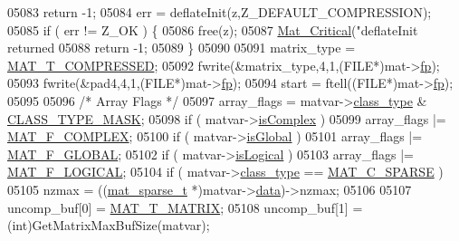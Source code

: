 \begin{DoxyCode}
{{{{{{{{{{{{{{{{{{{{{{{{{{{{{{05083             \textcolor{keywordflow}{return} -1;
05084         err = deflateInit(z,Z\_DEFAULT\_COMPRESSION);
05085         \textcolor{keywordflow}{if} ( err != Z\_OK ) \{
05086             free(z);
05087             \hyperlink{group__mat__util_gaf51f2bfbb5580f575e4dd79757e2b80c}{Mat\_Critical}(\textcolor{stringliteral}{"deflateInit returned %
05088             \textcolor{keywordflow}{return} -1;
05089         \}
05090 
05091         matrix\_type = \hyperlink{group___m_a_t_ggacf7b3b879282b7ab3a51190e49bf3453a30437f2eb3becc2fa6e5d96599d7f724}{MAT\_T\_COMPRESSED};
05092         fwrite(&matrix\_type,4,1,(FILE*)mat->\hyperlink{struct__mat__t_a85f562e407ca9ad4d2a6e14f839432b7}{fp});
05093         fwrite(&pad4,4,1,(FILE*)mat->\hyperlink{struct__mat__t_a85f562e407ca9ad4d2a6e14f839432b7}{fp});
05094         start = ftell((FILE*)mat->\hyperlink{struct__mat__t_a85f562e407ca9ad4d2a6e14f839432b7}{fp});
05095 
05096         \textcolor{comment}{/* Array Flags */}
05097         array\_flags = matvar->\hyperlink{group___m_a_t_aff13035bf3265dd7d9425e5d40c839d4}{class\_type} & \hyperlink{mat5_8c_a24b94e17e9c34b9c795798099c710751}{CLASS\_TYPE\_MASK};
05098         \textcolor{keywordflow}{if} ( matvar->\hyperlink{group___m_a_t_aeb03b3a69f108dc05470b00443a43739}{isComplex} )
05099             array\_flags |= \hyperlink{group___m_a_t_ggab9d6ef9e3ddca78a317b173f01d53fbbacd7b091a11184aad7fc6078c04470780}{MAT\_F\_COMPLEX};
05100         \textcolor{keywordflow}{if} ( matvar->\hyperlink{group___m_a_t_af26c71c4c0ddb14931d15910dddac1bc}{isGlobal} )
05101             array\_flags |= \hyperlink{group___m_a_t_ggab9d6ef9e3ddca78a317b173f01d53fbba49084e0c796aa7963e53f7539525d40d}{MAT\_F\_GLOBAL};
05102         \textcolor{keywordflow}{if} ( matvar->\hyperlink{group___m_a_t_a866c1539e68073a837833d74cd4a65be}{isLogical} )
05103             array\_flags |= \hyperlink{group___m_a_t_ggab9d6ef9e3ddca78a317b173f01d53fbba57eb5c6e200bcbc0f1b7982f29a169c2}{MAT\_F\_LOGICAL};
05104         \textcolor{keywordflow}{if} ( matvar->\hyperlink{group___m_a_t_aff13035bf3265dd7d9425e5d40c839d4}{class\_type} == \hyperlink{group___m_a_t_ggad4d60ae7b709fc81bfd744fb4c857c40a0d5655b7e6178a2242cb3bb56ff4c8d2}{MAT\_C\_SPARSE} )
05105             nzmax = ((\hyperlink{group___m_a_t_structmat__sparse__t}{mat\_sparse\_t} *)matvar->\hyperlink{group___m_a_t_a5672978efa230bbdecdf38ede781f7fa}{data})->nzmax;
05106 
05107         uncomp\_buf[0] = \hyperlink{group___m_a_t_ggacf7b3b879282b7ab3a51190e49bf3453a32985fee89a4df8db4b3f5d3a48823d3}{MAT\_T\_MATRIX};
05108         uncomp\_buf[1] = (int)GetMatrixMaxBufSize(matvar);
}}}}}}}}}}}}}}}}}}}}}}}}}}}}}}}
\end{DoxyCode}
